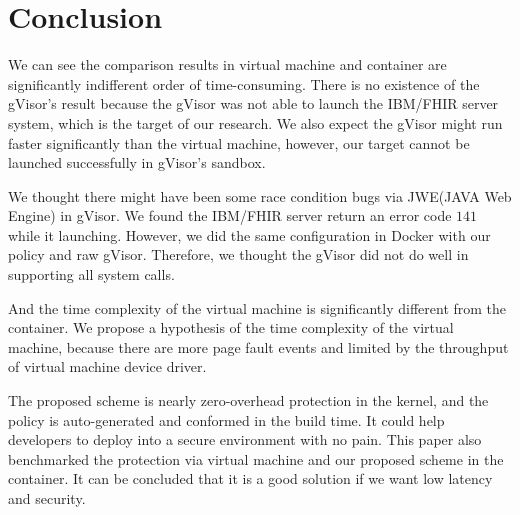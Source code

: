 \section{Conclusion}

We can see the comparison results in virtual machine and container are
significantly indifferent order of time-consuming. There is no existence
of the gVisor's result because the gVisor was not able to launch the
IBM/FHIR server system, which is the target of our research.
We also expect the gVisor might run faster significantly than the virtual
machine, however, our target cannot be launched successfully in
gVisor's sandbox.

We thought there might have been some race condition bugs via JWE(JAVA Web
Engine) in gVisor. We found the IBM/FHIR server return an error code $141$
while it launching. However, we did the same configuration in Docker with
our policy and raw gVisor. Therefore, we thought the gVisor did not do
well in supporting all system calls.

And the time complexity of the virtual machine is significantly different from
the container. We propose a hypothesis of the time complexity of the virtual
machine, because there are more page fault events and limited by the
throughput of virtual machine device driver\cite{10.5555/1267569.1267570,7095802}.

The proposed scheme is nearly zero-overhead protection in the kernel, and
the policy is auto-generated and conformed in the build time. It could help
developers to deploy into a secure environment with no pain. This paper also
benchmarked the protection via virtual machine and our proposed scheme in
the container. It can be concluded that it is a good solution if we want
low latency and security.



